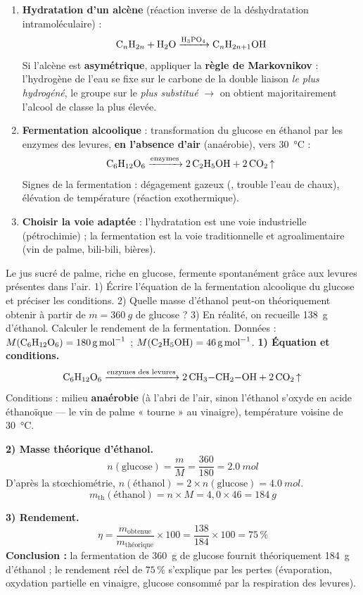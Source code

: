 \documentclass[11pt]{article}
\begin{document}
\begin{methode}
\begin{enumerate}
\item \textbf{Hydratation d'un alcène} (réaction inverse de la déshydratation intramoléculaire) :
\[ \ce{C_nH_{2n} + H2O ->[H3PO4] C_nH_{2n+1}OH} \]
Si l'alcène est \textbf{asymétrique}, appliquer la \textbf{règle de Markovnikov} : l'hydrogène de l'eau se fixe sur le carbone de la double liaison \emph{le plus hydrogéné}, le groupe  sur le \emph{plus substitué} $\rightarrow$ on obtient majoritairement l'alcool de classe la plus élevée.
\item \textbf{Fermentation alcoolique} : transformation du glucose en éthanol par les enzymes des levures, \textbf{en l'absence d'air} (anaérobie), vers \SI{30}{\celsius} :
\[ \ce{C6H12O6 ->[enzymes] 2 C2H5OH + 2 CO2 ^} \]
Signes de la fermentation : dégagement gazeux (, trouble l'eau de chaux), élévation de température (réaction exothermique).
\item \textbf{Choisir la voie adaptée} : l'hydratation est une voie industrielle (pétrochimie) ; la fermentation est la voie traditionnelle et agroalimentaire (vin de palme, bili-bili, bières).
\end{enumerate}
\end{methode}

\begin{exoresolu}
Le jus sucré de palme, riche en glucose, fermente spontanément grâce aux levures présentes dans l'air. 1) Écrire l'équation de la fermentation alcoolique du glucose et préciser les conditions. 2) Quelle masse d'éthanol peut-on théoriquement obtenir à partir de $m = \SI{360}{g}$ de glucose ? 3) En réalité, on recueille \SI{138}{g} d'éthanol. Calculer le rendement de la fermentation. Données : $M(\ce{C6H12O6}) = \SI{180}{g.mol^{-1}}$ ; $M(\ce{C2H5OH}) = \SI{46}{g.mol^{-1}}$.
\tcblower
\textbf{1) Équation et conditions.}
\[ \ce{C6H12O6 ->[\text{enzymes des levures}] 2 CH3-CH2-OH + 2 CO2 ^} \]
Conditions : milieu \textbf{anaérobie} (à l'abri de l'air, sinon l'éthanol s'oxyde en acide éthanoïque — le vin de palme « tourne » au vinaigre), température voisine de \SI{30}{\celsius}.

\textbf{2) Masse théorique d'éthanol.}
\[ n(\text{glucose}) = \frac{m}{M} = \frac{360}{180} = \SI{2,0}{mol} \]
D'après la stœchiométrie, $n(\text{éthanol}) = 2 \times n(\text{glucose}) = \SI{4,0}{mol}$.
\[ m_{\text{th}}(\text{éthanol}) = n \times M = 4,0 \times 46 = \SI{184}{g} \]

\textbf{3) Rendement.}
\[ \eta = \frac{m_{\text{obtenue}}}{m_{\text{théorique}}} \times 100 = \frac{138}{184} \times 100 = 75\,\% \]
\textbf{Conclusion :} la fermentation de \SI{360}{g} de glucose fournit théoriquement \SI{184}{g} d'éthanol ; le rendement réel de $75\,\%$ s'explique par les pertes (évaporation, oxydation partielle en vinaigre, glucose consommé par la respiration des levures).
\end{exoresolu}
\end{document}
